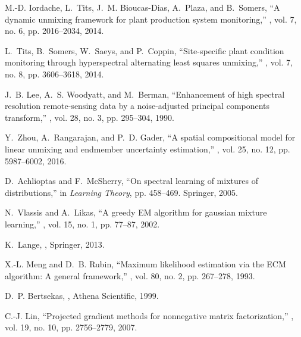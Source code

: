 \documentclass[twocolumn,english]{IEEEtran}
\theoremstyle{plain}
\begin{document}
\begin{thebibliography}{10}
M.-D. Iordache, L.~Tits, J.~M. Bioucas-Dias, A.~Plaza, and B.~Somers,
\newblock ``A dynamic unmixing framework for plant production system
  monitoring,''
, vol. 7, no. 6, pp. 2016--2034, 2014.

L.~Tits, B.~Somers, W.~Saeys, and P.~Coppin,
\newblock ``Site-specific plant condition monitoring through hyperspectral
  alternating least squares unmixing,''
, vol. 7, no. 8, pp. 3606--3618, 2014.

J.~B. Lee, A.~S. Woodyatt, and M.~Berman,
\newblock ``Enhancement of high spectral resolution remote-sensing data by a
  noise-adjusted principal components transform,''
, vol. 28,
  no. 3, pp. 295--304, 1990.

Y.~Zhou, A.~Rangarajan, and P.~D. Gader,
\newblock ``A spatial compositional model for linear unmixing and endmember
  uncertainty estimation,''
, vol. 25, no. 12, pp.
  5987--6002, 2016.

D.~Achlioptas and F.~McSherry,
\newblock ``On spectral learning of mixtures of distributions,''
\newblock in {\em Learning Theory}, pp. 458--469. Springer, 2005.

N.~Vlassis and A.~Likas,
\newblock ``A greedy {EM} algorithm for gaussian mixture learning,''
, vol. 15, no. 1, pp. 77--87, 2002.

K.~Lange,
,
\newblock Springer, 2013.

X.-L. Meng and D.~B. Rubin,
\newblock ``Maximum likelihood estimation via the {ECM} algorithm: A general
  framework,''
, vol. 80, no. 2, pp. 267--278, 1993.

D.~P. Bertsekas,
,
\newblock Athena Scientific, 1999.

C.-J. Lin,
\newblock ``Projected gradient methods for nonnegative matrix factorization,''
, vol. 19, no. 10, pp. 2756--2779, 2007.


\end{thebibliography}
\end{document}
